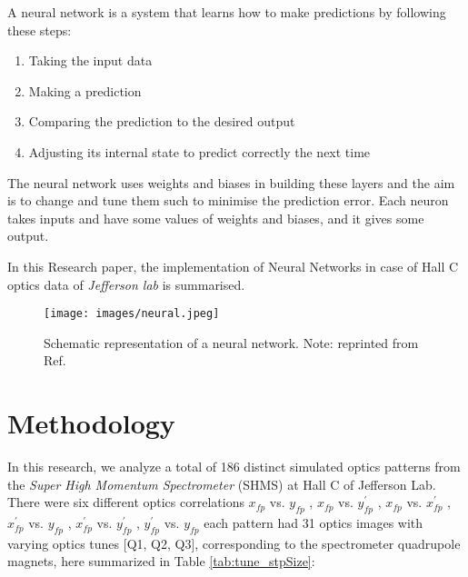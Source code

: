 \documentclass[conference]{IEEEtran}
\begin{document}
A neural network is a system that learns how to make predictions by following these steps:
\begin{enumerate}
    \item Taking the input data
    \item Making a prediction
    \item Comparing the prediction to the desired output
    \item Adjusting its internal state to predict correctly the next time
\end{enumerate}
The neural network uses weights and biases in building these layers and the aim is to change and tune them such to minimise the prediction error.
Each neuron takes inputs and have some values of weights and biases, and it gives some output.

In this Research paper, the implementation of Neural Networks in case of Hall C optics data of \emph{Jefferson lab} is summarised.

\begin{figure}[h]
    \centering
    \texttt{[image: images/neural.jpeg]}
    \caption{Schematic representation of a neural network. Note: reprinted from Ref. \cite{NN_Intro_TB_2020}}
    \label{fig:neuron_img.png}
\end{figure}



\section{Methodology}
\indent In this research, we analyze a total of 186 distinct simulated optics patterns from the \emph{Super High Momentum Spectrometer} (SHMS) at Hall C of Jefferson Lab.
There were six different optics correlations  $x_{fp}$ vs. $y_{fp}$  ,  $x_{fp}$ vs. $y^{'}_{fp}$  ,  $x_{fp}$ vs. $x^{'}_{fp}$  ,  $x^{'}_{fp}$ vs. $y_{fp}$  ,  $x^{'}_{fp}$ vs. $y^{'}_{fp}$  ,  $y^{'}_{fp}$ vs. $y_{fp}$  each pattern had 31 optics images with varying optics tunes [Q1, Q2, Q3], corresponding to the spectrometer quadrupole magnets, here summarized in Table \ref{tab:tune_stpSize}:
\end{document}
